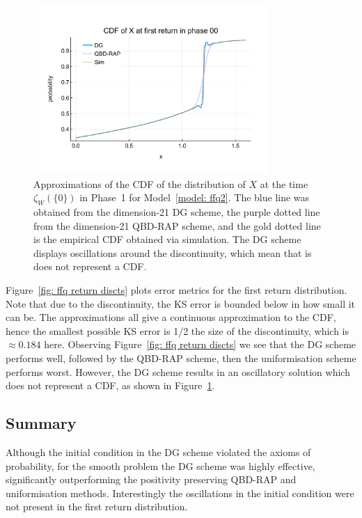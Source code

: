 \begin{figure}[h] 
	\centering
	\includegraphics[width=0.8\textwidth,trim={0cm 1.25cm 0cm 1.25cm},clip]{chapter6/figs/ffq/discts/phase_4_cdf.pdf}%
	\caption{Approximations of the CDF of the distribution of \(X\) at the time \(\zeta_W(\{0\})\) in Phase~1 for Model~\ref{model: ffq2}. The blue line was obtained from the dimension-21 DG scheme, the purple dotted line from the dimension-21 QBD-RAP scheme, and the gold dotted line is the empirical CDF obtained via simulation. The DG scheme displays oscillations around the discontinuity, which mean that is does not represent a CDF.} 
	\label{fig: ffq2 oscillation} 
\end{figure}
Figure~\ref{fig: ffq return discts} plots error metrics for the first return distribution. Note that due to the discontinuity, the KS error is bounded below in how small it can be. The approximations all give a continuous approximation to the CDF, hence the smallest possible KS error is 1/2 the size of the discontinuity, which is \(\approx 0.184\) here. Observing Figure~\ref{fig: ffq return discts} we see that the DG scheme performs well, followed by the QBD-RAP scheme, then the uniformisation scheme performs worst. However, the DG scheme results in an oscillatory solution which does not represent a CDF, as shown in Figure~\ref{fig: ffq2 oscillation}.


\subsection{Summary}
Although the initial condition in the DG scheme violated the axioms of probability, for the smooth problem the DG scheme was highly effective, significantly outperforming the positivity preserving QBD-RAP and uniformisation methods. Interestingly the oscillations in the initial condition were not present in the first return distribution. 

